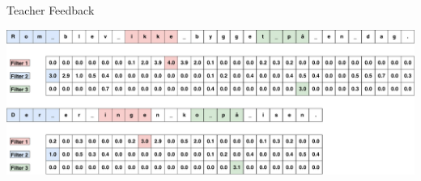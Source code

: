 \documentclass[10pt]{beamer}
\begin{document}
\begin{frame}[fragile]{Teacher Feedback}
    \begin{center}
        \includegraphics[width=\textwidth]{../../report/pictures/discussion/teacher_feedback_example}
    \end{center}
\end{frame}
\end{document}
